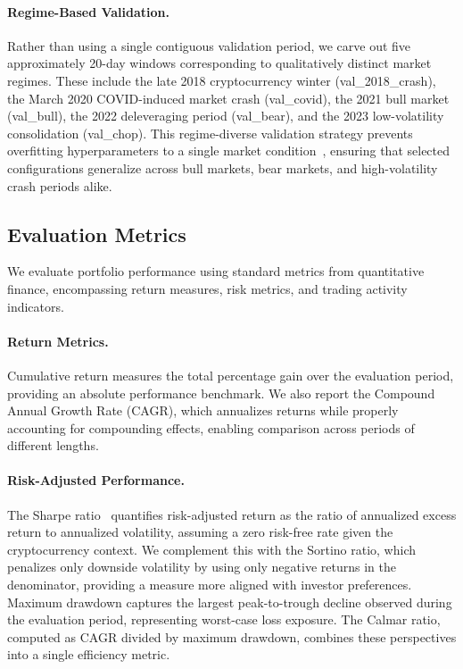 \paragraph{Regime-Based Validation.} Rather than using a single contiguous validation period, we carve out five approximately 20-day windows corresponding to qualitatively distinct market regimes. These include the late 2018 cryptocurrency winter (val\_2018\_crash), the March 2020 COVID-induced market crash (val\_covid), the 2021 bull market (val\_bull), the 2022 deleveraging period (val\_bear), and the 2023 low-volatility consolidation (val\_chop). This regime-diverse validation strategy prevents overfitting hyperparameters to a single market condition~\citep{jiang2016drlt, jiang2017eIIE}, ensuring that selected configurations generalize across bull markets, bear markets, and high-volatility crash periods alike.

\subsection{Evaluation Metrics}
\label{sec:metrics}

We evaluate portfolio performance using standard metrics from quantitative finance, encompassing return measures, risk metrics, and trading activity indicators.

\paragraph{Return Metrics.} Cumulative return measures the total percentage gain over the evaluation period, providing an absolute performance benchmark. We also report the Compound Annual Growth Rate (CAGR), which annualizes returns while properly accounting for compounding effects, enabling comparison across periods of different lengths.

\paragraph{Risk-Adjusted Performance.} The Sharpe ratio~\citep{sharpe1966mutual} quantifies risk-adjusted return as the ratio of annualized excess return to annualized volatility, assuming a zero risk-free rate given the cryptocurrency context. We complement this with the Sortino ratio, which penalizes only downside volatility by using only negative returns in the denominator, providing a measure more aligned with investor preferences. Maximum drawdown captures the largest peak-to-trough decline observed during the evaluation period, representing worst-case loss exposure. The Calmar ratio, computed as CAGR divided by maximum drawdown, combines these perspectives into a single efficiency metric.

